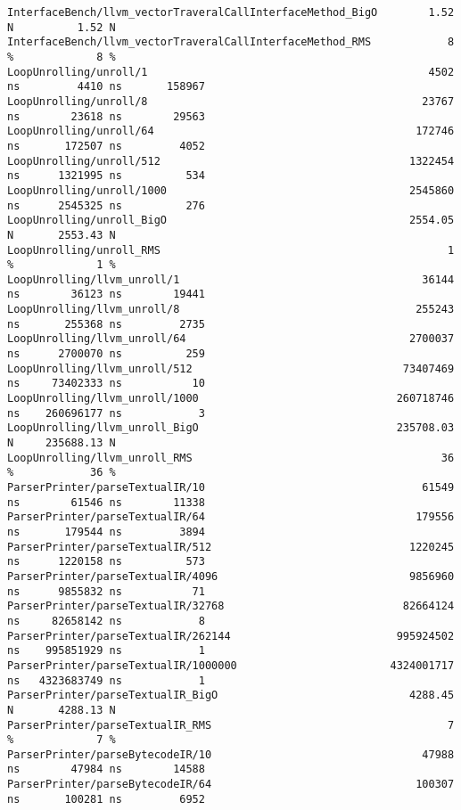 \begin{code}
\begin{verbatim}
InterfaceBench/llvm_vectorTraveralCallInterfaceMethod_BigO        1.52 N          1.52 N
InterfaceBench/llvm_vectorTraveralCallInterfaceMethod_RMS            8 %             8 %
LoopUnrolling/unroll/1                                            4502 ns         4410 ns       158967
LoopUnrolling/unroll/8                                           23767 ns        23618 ns        29563
LoopUnrolling/unroll/64                                         172746 ns       172507 ns         4052
LoopUnrolling/unroll/512                                       1322454 ns      1321995 ns          534
LoopUnrolling/unroll/1000                                      2545860 ns      2545325 ns          276
LoopUnrolling/unroll_BigO                                      2554.05 N       2553.43 N
LoopUnrolling/unroll_RMS                                             1 %             1 %
LoopUnrolling/llvm_unroll/1                                      36144 ns        36123 ns        19441
LoopUnrolling/llvm_unroll/8                                     255243 ns       255368 ns         2735
LoopUnrolling/llvm_unroll/64                                   2700037 ns      2700070 ns          259
LoopUnrolling/llvm_unroll/512                                 73407469 ns     73402333 ns           10
LoopUnrolling/llvm_unroll/1000                               260718746 ns    260696177 ns            3
LoopUnrolling/llvm_unroll_BigO                               235708.03 N     235688.13 N
LoopUnrolling/llvm_unroll_RMS                                       36 %            36 %
ParserPrinter/parseTextualIR/10                                  61549 ns        61546 ns        11338
ParserPrinter/parseTextualIR/64                                 179556 ns       179544 ns         3894
ParserPrinter/parseTextualIR/512                               1220245 ns      1220158 ns          573
ParserPrinter/parseTextualIR/4096                              9856960 ns      9855832 ns           71
ParserPrinter/parseTextualIR/32768                            82664124 ns     82658142 ns            8
ParserPrinter/parseTextualIR/262144                          995924502 ns    995851929 ns            1
ParserPrinter/parseTextualIR/1000000                        4324001717 ns   4323683749 ns            1
ParserPrinter/parseTextualIR_BigO                              4288.45 N       4288.13 N
ParserPrinter/parseTextualIR_RMS                                     7 %             7 %
ParserPrinter/parseBytecodeIR/10                                 47988 ns        47984 ns        14588
ParserPrinter/parseBytecodeIR/64                                100307 ns       100281 ns         6952

\end{verbatim}
\end{code}
